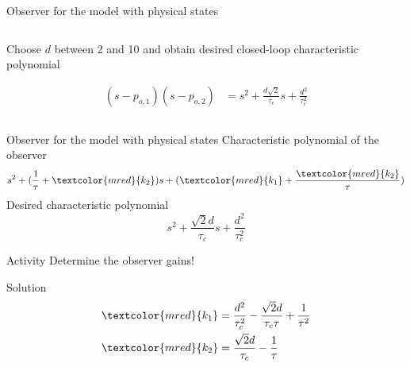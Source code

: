 \documentclass[presentation,aspectratio=169]{beamer}
\begin{document}
\begin{frame}[label={sec:org3f6e467}]{Observer for the model with physical states}
\begin{columns}
\begin{column}{0.4\columnwidth}
\begin{center}
\end{center}

Choose \(d\) between 2 and 10 and  obtain desired closed-loop characteristic polynomial

\begin{align*}
  (s-p_{o,1})(s-p_{o,2}) &= s^2 + \frac{d\sqrt{2}}{\tau_c}s + \frac{d^2}{\tau_c^2}
\end{align*}
\end{column}
\end{columns}
\end{frame}

\begin{frame}[label={sec:orgfc87ee3}]{Observer for the model with physical states}
Characteristic polynomial of the observer 
\[s^2 + (\frac{1}{\tau} + \textcolor{mred}{k_2})s + (\textcolor{mred}{k_1}+\frac{\textcolor{mred}{k_2}}{\tau})\]
Desired characteristic polynomial
\[  s^2 + \frac{\sqrt{2}d}{\tau_c}s + \frac{d^2}{\tau_c^2}\]
\pause

\alert{Activity}
Determine the observer gains!

\pause
\alert{Solution}
\pause
\begin{align*}
 \textcolor{mred}{k_1} &= \frac{d^2}{\tau_c^2} - \frac{\sqrt{2}d}{\tau_c\tau} + \frac{1}{\tau^2}\\
 \textcolor{mred}{k_2} &= \frac{\sqrt{2}d}{\tau_c} - \frac{1}{\tau} 
\end{align*}
\end{frame}
\end{document}
